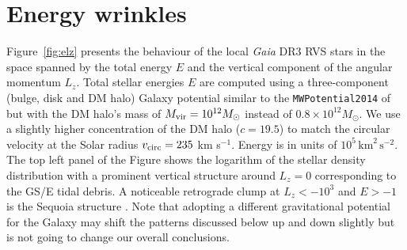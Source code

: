\documentclass[a4paper,useAMS,usenatbib]{mnras}
\begin{document}
\section{Energy wrinkles}
\label{sec:energy}
 Figure~\ref{fig:elz} presents the behaviour of the local {\it Gaia} DR3 RVS stars in the space spanned by the total energy $E$ and the vertical component of the angular momentum $L_z$. Total stellar energies $E$ are computed using a three-component (bulge, disk and DM halo) Galaxy potential similar to the \texttt{MWPotential2014} of \citet{Bovy2015} but with the DM halo's mass of $M_{\rm vir}=10^{12} M_{\odot}$  instead of $0.8\times 10^{12} M_{\odot}$. We use a slightly higher concentration of the DM halo ($c=19.5$) to match the circular velocity at the Solar radius $v_{\rm circ}=235$ km s$^{-1}$. Energy is in units of $10^5\,\mathrm{km}^2\,\mathrm{s}^{-2}$. The top left panel of the Figure shows the logarithm of the stellar density distribution with a prominent vertical structure around $L_z=0$ corresponding to the GS/E tidal debris. A noticeable retrograde clump at $L_z<-10^3$ and $E>-1$ is the Sequoia structure \citep[][]{Myeong2019,Matsuno2019}. Note that adopting a different gravitational potential for the Galaxy may shift the patterns discussed below up and down slightly but is not going to change our overall conclusions.
\end{document}
